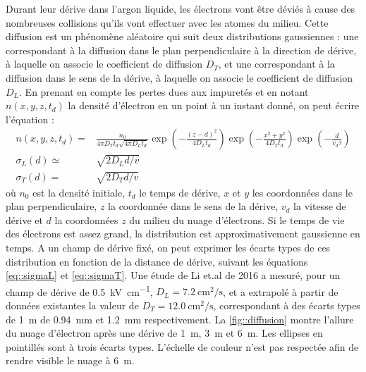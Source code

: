         Durant leur dérive dans l'argon liquide, les électrons vont être déviés à cause des nombreuses collisions qu'ils vont effectuer avec les atomes du milieu. Cette diffusion est un phénomène aléatoire qui suit deux distributions gaussiennes : une correspondant à la diffusion dans le plan perpendiculaire à la direction de dérive, à laquelle on associe le coefficient de diffusion $D_T$, et une correspondant à la diffusion dans le sens de la dérive, à laquelle on associe le coefficient de diffusion $D_L$. En prenant en compte les pertes dues aux impuretés et en notant $n(x,y,z,t_d)$ la densité d'électron en un point à un instant donné, on peut écrire l'équation : 
        \begin{eqnarray}
          n(x,y,z,t_d) = & \frac{n_0}{4\pi D_T t_d\sqrt{4\pi D_L t_d}}\exp\left(-\frac{(z-d)^2}{4D_L t_d}\right)\exp\left(-\frac{x^2+y^2}{4D_T t_d}\right)\exp\left(-\frac{d}{v_d\tau}\right) \label{eq::diffusion} \\
          \sigma_L(d) \simeq & \sqrt{2 D_L d/v} \label{eq::sigmaL} \\
          \sigma_T(d) = & \sqrt{2 D_T d/v} \label{eq::sigmaT}
        \end{eqnarray}
        où $n_0$ est la densité initiale, $t_d$ le temps de dérive, $x$ et $y$ les coordonnées dans le plan perpendiculaire, $z$ la coordonnée dans le sens de la dérive, $v_d$ la vitesse de dérive et $d$ la coordonnées $z$ du milieu du nuage d'électrons. Si le temps de vie des électrons est assez grand, la distribution est approximativement gaussienne en temps. A un champ de dérive fixé, on peut exprimer les écarts types de ces distribution en fonction de la distance de dérive, suivant les équations \eqref{eq::sigmaL} et \eqref{eq::sigmaT}. Une étude de Li et.al de 2016\cite{Li2015} a mesuré, pour un champ de dérive de \SI{0.5}{\kilo\volt\per\centi\meter}, $D_L=\SI{7.2}{\centi\meter\squared\per\second}$, et a extrapolé à partir de données existantes la valeur de $D_T=\SI{12.0}{\centi\meter\squared\per\second}$, correspondant à des écarts types de \SI{1}{\meter} de \SI{0.94}{\milli\meter} et \SI{1.2}{\milli\meter} respectivement. La \autoref{fig::diffusion} montre l'allure du nuage d'électron après une dérive de \SI{1}{\meter}, \SI{3}{\meter} et \SI{6}{\meter}. Les ellipses en pointillés sont à trois écarts types. L'échelle de couleur n'est pas respectée afin de rendre visible le nuage à \SI{6}{\meter}.

